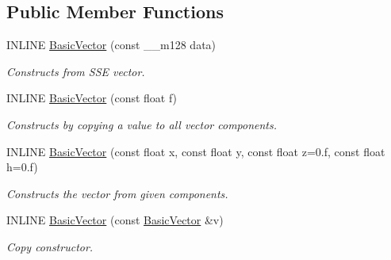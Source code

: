 \subsection*{Public Member Functions}
\begin{DoxyCompactItemize}
\item 
\hypertarget{classBasicVector_3_01float_01_4_ae309744da3e13579d30f8df6f9b7c9ed}{}\label{classBasicVector_3_01float_01_4_ae309744da3e13579d30f8df6f9b7c9ed} 
I\+N\+L\+I\+NE \hyperlink{classBasicVector_3_01float_01_4_ae309744da3e13579d30f8df6f9b7c9ed}{Basic\+Vector} (const \+\_\+\+\_\+m128 data)
\begin{DoxyCompactList}\small\item\em Constructs from S\+SE vector. \end{DoxyCompactList}\item 
\hypertarget{classBasicVector_3_01float_01_4_a781592c27e7c0921ccc39d2d9000ab36}{}\label{classBasicVector_3_01float_01_4_a781592c27e7c0921ccc39d2d9000ab36} 
I\+N\+L\+I\+NE \hyperlink{classBasicVector_3_01float_01_4_a781592c27e7c0921ccc39d2d9000ab36}{Basic\+Vector} (const float f)
\begin{DoxyCompactList}\small\item\em Constructs by copying a value to all vector components. \end{DoxyCompactList}\item 
\hypertarget{classBasicVector_3_01float_01_4_ad8445726393e01de743256cadb58c11f}{}\label{classBasicVector_3_01float_01_4_ad8445726393e01de743256cadb58c11f} 
I\+N\+L\+I\+NE \hyperlink{classBasicVector_3_01float_01_4_ad8445726393e01de743256cadb58c11f}{Basic\+Vector} (const float x, const float y, const float z=0.f, const float h=0.f)
\begin{DoxyCompactList}\small\item\em Constructs the vector from given components. \end{DoxyCompactList}\item 
\hypertarget{classBasicVector_3_01float_01_4_aa257e64fdb7ab1803bc19b7907f18f77}{}\label{classBasicVector_3_01float_01_4_aa257e64fdb7ab1803bc19b7907f18f77} 
I\+N\+L\+I\+NE \hyperlink{classBasicVector_3_01float_01_4_aa257e64fdb7ab1803bc19b7907f18f77}{Basic\+Vector} (const \hyperlink{classBasicVector}{Basic\+Vector} \&v)
\begin{DoxyCompactList}\small\item\em Copy constructor. \end{DoxyCompactList}\item 
\hypertarget{classBasicVector_3_01float_01_4_a0266fc91fed60b9720195065fe8686ee}{}\label{classBasicVector_3_01float_01_4_a0266fc91fed60b9720195065fe8686ee} 

\end{DoxyCompactItemize}
